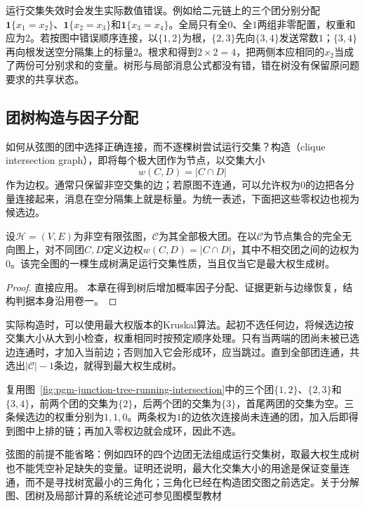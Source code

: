运行交集失效时会发生实际数值错误。例如给二元链上的三个团分别分配$\mathbf{1}\{x_1=x_2\}$、$\mathbf{1}\{x_2=x_3\}$和$\mathbf{1}\{x_3=x_4\}$。全局只有全$0$、全$1$两组非零配置，权重和应为$2$。若按图中错误顺序连接，以$\{1,2\}$为根，$\{2,3\}$先向$\{3,4\}$发送常数$1$；$\{3,4\}$再向根发送空分隔集上的标量$2$。根求和得到$2\times2=4$，把两侧本应相同的$x_2$当成了两份可分别求和的变量。树形与局部消息公式都没有错，错在树没有保留原问题要求的共享状态。

\subsection{团树构造与因子分配}
\label{sec:pgm-junction-tree-spanning-tree}

如何从弦图的团中选择正确连接，而不逐棵树尝试运行交集？构造（clique intersection graph），即将每个极大团作为节点，以交集大小
\[
  w(C,D)=|C\cap D|
\]
作为边权。通常只保留非空交集的边；若原图不连通，可以允许权为$0$的边把各分量连接起来，消息在空分隔集上就是标量。为统一表述，下面把这些零权边也视为候选边。

\begin{theorem}[最大权生成树与团树]
  \label{thm:pgm-junction-tree-maximum-weight}
  设$\mathcal{H}=(V,E)$为非空有限弦图，$\mathcal{C}$为其全部极大团。在以$\mathcal{C}$为节点集合的完全无向图上，对不同团$C,D$定义边权$w(C,D)=|C\cap D|$，其中不相交团之间的边权为$0$。该完全图的一棵生成树满足运行交集性质，当且仅当它是最大权生成树。
\end{theorem}

\begin{proof}
  直接应用。
  本章在得到树后增加概率因子分配、证据更新与边缘恢复，结构判据本身沿用卷一。
\end{proof}

实际构造时，可以使用最大权版本的Kruskal算法。起初不选任何边，将候选边按交集大小从大到小检查，权重相同时按预定顺序处理。只有当两端的团尚未被已选边连通时，才加入当前边；否则加入它会形成环，应当跳过。直到全部团连通，共选出$|\mathcal{C}|-1$条边，就得到最大权生成树。

复用图~\ref{fig:pgm-junction-tree-running-intersection}中的三个团$\{1,2\}$、$\{2,3\}$和$\{3,4\}$，前两个团的交集为$\{2\}$，后两个团的交集为$\{3\}$，首尾两团的交集为空。三条候选边的权重分别为$1,1,0$。两条权为$1$的边依次连接尚未连通的团，加入后即得到图中上排的链；再加入零权边就会成环，因此不选。

弦图的前提不能省略：例如四环的四个边团无法组成运行交集树，取最大权生成树也不能凭空补足缺失的变量。证明还说明，最大化交集大小的用途是保证变量连通，而不是寻找树宽最小的三角化；三角化已经在构造团交图之前选定。关于分解图、团树及局部计算的系统论述可参见图模型教材

